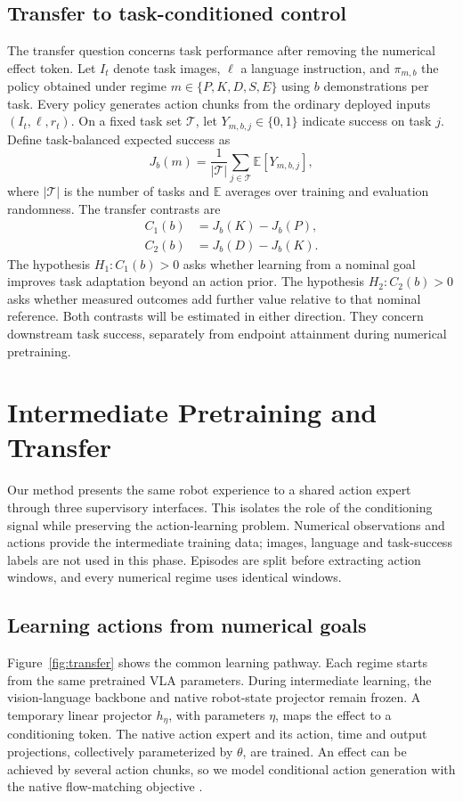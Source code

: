 \documentclass[conference]{IEEEtran}
\newcommand{\E}{\mathbb{E}}
\begin{document}
\subsection{Transfer to task-conditioned control}
The transfer question concerns task performance after removing the numerical effect token. Let $I_t$ denote task images, $\ell$ a language instruction, and $\pi_{m,b}$ the policy obtained under regime $m\in\{P,K,D,S,E\}$ using $b$ demonstrations per task. Every policy generates action chunks from the ordinary deployed inputs $(I_t,\ell,r_t)$. On a fixed task set $\mathcal T$, let $Y_{m,b,j}\in\{0,1\}$ indicate success on task $j$. Define task-balanced expected success as
\begin{equation}
 J_b(m)=\frac{1}{|\mathcal T|}\sum_{j\in\mathcal T}\E[Y_{m,b,j}],
 \label{eq:utility}
\end{equation}
where $|\mathcal T|$ is the number of tasks and $\E$ averages over training and evaluation randomness. The transfer contrasts are
\begin{equation}
 \begin{aligned}
 C_1(b)&=J_b(K)-J_b(P),\\
 C_2(b)&=J_b(D)-J_b(K).
 \end{aligned}
 \label{eq:contrasts}
\end{equation}
The hypothesis $H_1:C_1(b)>0$ asks whether learning from a nominal goal improves task adaptation beyond an action prior. The hypothesis $H_2:C_2(b)>0$ asks whether measured outcomes add further value relative to that nominal reference. Both contrasts will be estimated in either direction. They concern downstream task success, separately from endpoint attainment during numerical pretraining.

\section{Intermediate Pretraining and Transfer}
Our method presents the same robot experience to a shared action expert through three supervisory interfaces. This isolates the role of the conditioning signal while preserving the action-learning problem. Numerical observations and actions provide the intermediate training data; images, language and task-success labels are not used in this phase. Episodes are split before extracting action windows, and every numerical regime uses identical windows.

\subsection{Learning actions from numerical goals}
Figure~\ref{fig:transfer} shows the common learning pathway. Each regime starts from the same pretrained VLA parameters. During intermediate learning, the vision-language backbone and native robot-state projector remain frozen. A temporary linear projector $h_\eta$, with parameters $\eta$, maps the effect to a conditioning token. The native action expert and its action, time and output projections, collectively parameterized by $\theta$, are trained. An effect can be achieved by several action chunks, so we model conditional action generation with the native flow-matching objective \citep{lipman2023flow}.
\end{document}
